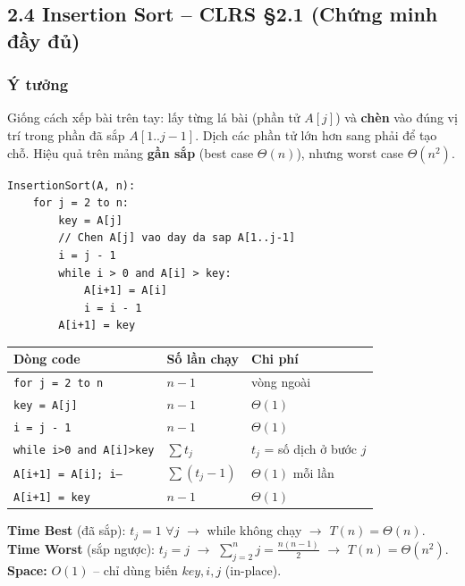 \documentclass[10pt]{article}
\begin{document}
\subsection{\texorpdfstring{2.4 Insertion Sort -- CLRS \S 2.1 (Chứng
minh đầy
đủ)}{2.4 Insertion Sort -- CLRS 2.1 (Chứng minh đầy đủ)}}\label{insertion-sort-clrs-2.1-chux1ee9ng-minh-ux111ux1ea7y-ux111ux1ee7}

\subsubsection{Ý tưởng}
Giống cách xếp bài trên tay: lấy từng lá bài (phần tử $A[j]$) và \textbf{chèn} vào đúng vị trí trong phần đã sắp $A[1..j-1]$. Dịch các phần tử lớn hơn sang phải để tạo chỗ. Hiệu quả trên mảng \textbf{gần sắp} (best case $\Theta(n)$), nhưng worst case $\Theta(n^2)$.

\begin{tcolorbox}[colback=gray!8, colframe=gray!50, boxrule=0.5pt, arc=2pt,
  left=6pt, right=6pt, top=4pt, bottom=4pt,
  title={\small\textbf{Pseudocode 4: Insertion Sort}}]
\begin{verbatim}
InsertionSort(A, n):
    for j = 2 to n:
        key = A[j]
        // Chen A[j] vao day da sap A[1..j-1]
        i = j - 1
        while i > 0 and A[i] > key:
            A[i+1] = A[i]
            i = i - 1
        A[i+1] = key
\end{verbatim}
\end{tcolorbox}

\begin{tcolorbox}[colback=yellow!5, colframe=orange!50, boxrule=0.5pt, arc=2pt, title={\small\textbf{Phân tích Complexity -- Insertion Sort (CLRS \S 2.2)}}]
\begin{tabular}{|l|l|l|}
\hline
\textbf{Dòng code} & \textbf{Số lần chạy} & \textbf{Chi phí} \\
\hline
\texttt{for j = 2 to n} & $n-1$ & vòng ngoài \\
\hline
\quad \texttt{key = A[j]} & $n-1$ & $\Theta(1)$ \\
\hline
\quad \texttt{i = j - 1} & $n-1$ & $\Theta(1)$ \\
\hline
\quad \texttt{while i>0 and A[i]>key} & $\sum t_j$ & $t_j$ = số dịch ở bước $j$ \\
\hline
\quad\quad \texttt{A[i+1] = A[i]; i--} & $\sum (t_j-1)$ & $\Theta(1)$ mỗi lần \\
\hline
\quad \texttt{A[i+1] = key} & $n-1$ & $\Theta(1)$ \\
\hline
\end{tabular}
\vspace{0.2cm}

\textbf{Time Best} (đã sắp): $t_j=1$ $\forall j$ $\to$ while không chạy $\to$ $T(n)=\Theta(n)$.\\
\textbf{Time Worst} (sắp ngược): $t_j=j$ $\to$ $\sum_{j=2}^{n}j=\frac{n(n-1)}{2}$ $\to$ $T(n)=\Theta(n^2)$.\\
\textbf{Space:} $O(1)$ -- chỉ dùng biến $key, i, j$ (in-place).
\end{tcolorbox}
\end{document}
